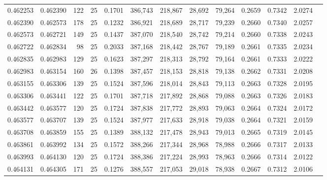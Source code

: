 \begin{tabular}{rrrrrrrrrrrrr}
0.462253 & 0.462390 &   122 &  25 &                                     0.1701 & 386,743 & 218,867 &  28,692 &  79,264 & 0.2659 & 0.7342 & 2.0274 \\
0.462390 & 0.462573 &   178 &  25 &                                     0.1232 & 386,921 & 218,689 &  28,717 &  79,239 & 0.2660 & 0.7340 & 2.0257 \\
0.462573 & 0.462721 &   149 &  25 &                                     0.1437 & 387,070 & 218,540 &  28,742 &  79,214 & 0.2660 & 0.7338 & 2.0243 \\
0.462722 & 0.462834 &    98 &  25 &                                     0.2033 & 387,168 & 218,442 &  28,767 &  79,189 & 0.2661 & 0.7335 & 2.0234 \\
0.462835 & 0.462983 &   129 &  25 &                                     0.1623 & 387,297 & 218,313 &  28,792 &  79,164 & 0.2661 & 0.7333 & 2.0222 \\
0.462983 & 0.463154 &   160 &  26 &                                     0.1398 & 387,457 & 218,153 &  28,818 &  79,138 & 0.2662 & 0.7331 & 2.0208 \\
0.463155 & 0.463306 &   139 &  25 &                                     0.1524 & 387,596 & 218,014 &  28,843 &  79,113 & 0.2663 & 0.7328 & 2.0195 \\
0.463306 & 0.463441 &   122 &  25 &                                     0.1701 & 387,718 & 217,892 &  28,868 &  79,088 & 0.2663 & 0.7326 & 2.0183 \\
0.463442 & 0.463577 &   120 &  25 &                                     0.1724 & 387,838 & 217,772 &  28,893 &  79,063 & 0.2664 & 0.7324 & 2.0172 \\
0.463577 & 0.463707 &   139 &  25 &                                     0.1524 & 387,977 & 217,633 &  28,918 &  79,038 & 0.2664 & 0.7321 & 2.0159 \\
0.463708 & 0.463859 &   155 &  25 &                                     0.1389 & 388,132 & 217,478 &  28,943 &  79,013 & 0.2665 & 0.7319 & 2.0145 \\
0.463861 & 0.463992 &   134 &  25 &                                     0.1572 & 388,266 & 217,344 &  28,968 &  78,988 & 0.2666 & 0.7317 & 2.0133 \\
0.463993 & 0.464130 &   120 &  25 &                                     0.1724 & 388,386 & 217,224 &  28,993 &  78,963 & 0.2666 & 0.7314 & 2.0122 \\
0.464131 & 0.464305 &   171 &  25 &                                     0.1276 & 388,557 & 217,053 &  29,018 &  78,938 & 0.2667 & 0.7312 & 2.0106 \\

\end{tabular}
